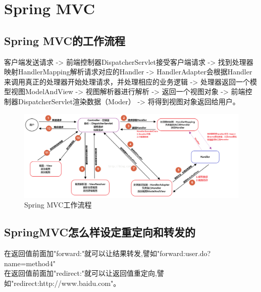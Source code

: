\section{Spring MVC}
\subsection{Spring MVC的工作流程}
客户端发送请求 -> 前端控制器DispatcherServlet接受客户端请求 -> 找到处理器映射HandlerMapping解析请求对应的Handler -> HandlerAdapter会根据Handler来调用真正的处理器开始处理请求，并处理相应的业务逻辑 -> 处理器返回一个模型视图ModelAndView -> 视图解析器进行解析 -> 返回一个视图对象 -> 前端控制器DispatcherServlet渲染数据（Moder） -> 将得到视图对象返回给用户。
\begin{figure}[H]
    \centering
    \includegraphics[scale=0.65]{./images/0016.png}
    \caption{Spring MVC工作流程}
\end{figure}
\subsection{SpringMVC怎么样设定重定向和转发的}
在返回值前面加"forward:"就可以让结果转发,譬如"forward:user.do?name=method4"\\
在返回值前面加"redirect:"就可以让返回值重定向,譬如"redirect:http://www.baidu.com"。
